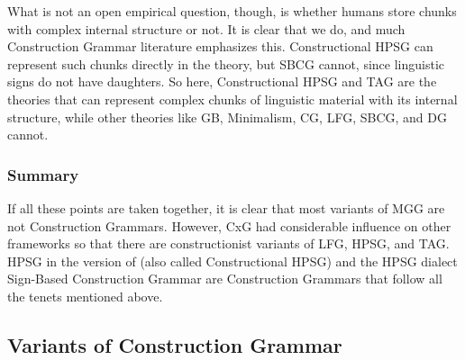 \documentclass[output=paper,biblatex,babelshorthands,newtxmath,draftmode,colorlinks,citecolor=brown]{langscibook}
\begin{document}
What is not an open empirical question, though, is whether humans store chunks with complex internal
structure or not. It is clear that we do, and much Construction Grammar literature emphasizes
this. Constructional HPSG can represent such chunks directly in the theory, but SBCG cannot, since
linguistic signs do not have daughters. So here, Constructional HPSG and TAG are the theories that
can represent complex chunks of linguistic material with its internal structure, while other
theories like GB, Minimalism, CG, LFG, SBCG, and DG cannot.

\subsubsection{Summary}

\largerpage
If all these points are taken together, it is clear that most variants of MGG are not Construction
Grammars. However, CxG had considerable influence on other frameworks so that there are
constructionist variants of LFG, HPSG, and TAG. HPSG in the version of \citet{Sag97a} (also called
Constructional HPSG) and the HPSG dialect Sign-Based Construction Grammar are Construction Grammars
that follow all the tenets mentioned above.


\subsection{Variants of Construction Grammar}
\end{document}
